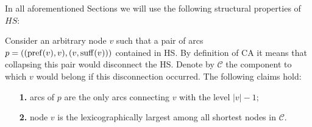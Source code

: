 In all aforementioned Sections we will use the following structural properties of $HS$:
\begin{lemma}\label{lemma:property}
    Consider an arbitrary node $v$ such that a pair of arcs $p = ((\operatorname{pref}(v), v), (v, \operatorname{suff}(v)))$ contained in HS. By definition of CA it means that collapsing this pair would disconnect the HS. Denote by $\mathcal{C}$ the component to which $v$ would belong if this disconnection occurred. The following claims hold:
    \begin{itemize}
        \item[\bf 1.] arcs of $p$ are the only arcs connecting $v$ with the level $|v|-1$;
        \item[\bf 2.] node $v$ is the lexicographically largest among all shortest nodes in $\mathcal{C}$.
    \end{itemize}    
\end{lemma}
